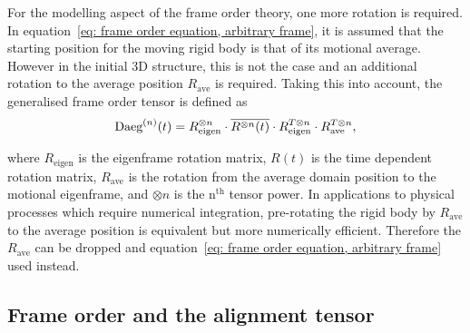 For the modelling aspect of the frame order theory, one more rotation is required.
In equation~\ref{eq: frame order equation, arbitrary frame}, it is assumed that the starting position for the moving rigid body is that of its motional average.
However in the initial 3D structure, this is not the case and an additional rotation to the average position $R_{\textrm{ave}}$ is required.
Taking this into account, the generalised frame order tensor is defined as
\begin{equation}
    \textrm{Daeg}^{(n)}(t) = R_{\textrm{eigen}}^{\otimes n} \cdot \overline{R^{\otimes n}(t)} \cdot R_{\textrm{eigen}}^{T \otimes n} \cdot R_{\textrm{ave}}^{T \otimes n} ,
\end{equation}

where $R_{\textrm{eigen}}$ is the eigenframe rotation matrix, $R(t)$ is the time dependent rotation matrix, $R_{\textrm{ave}}$ is the rotation from the average domain position to the motional eigenframe, and $\otimes n$ is the n$^{\textrm{th}}$ tensor power.
In applications to physical processes which require numerical integration, pre-rotating the rigid body by $R_{\textrm{ave}}$ to the average position is equivalent but more numerically efficient.
Therefore the $R_{\textrm{ave}}$ can be dropped and equation~\ref{eq: frame order equation, arbitrary frame} used instead.

%
%
%





\subsection{Frame order and the alignment tensor}





